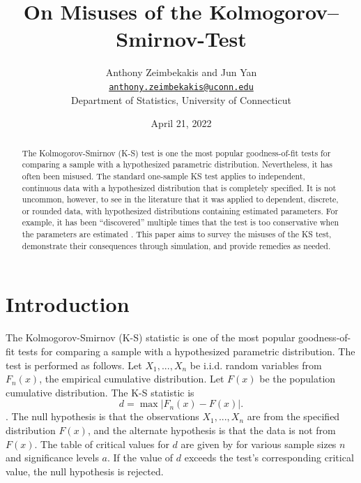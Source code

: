 \documentclass[12pt, letterpaper, titlepage]{article}
\title{On Misuses of the Kolmogorov–Smirnov-Test}
\author{Anthony Zeimbekakis and Jun Yan\\
\href{mailto:anthony.zeimbekakis@uconn.edu}{\nolinkurl{anthony.zeimbekakis@uconn.edu}}\\
Department of Statistics, University of Connecticut}
\date{April 21, 2022}
\begin{document}
\maketitle

\doublespace

\begin{abstract}
The Kolmogorov-Smirnov (K-S) test is one the most popular goodness-of-fit tests for 
comparing a sample with a hypothesized parametric distribution. Nevertheless, it has 
often been misused. The standard one-sample KS test applies to independent, continuous 
data with a hypothesized distribution that is completely specified. It is not uncommon, 
however, to see in the literature that it was applied to dependent, discrete, or 
rounded data, with hypothesized distributions containing estimated parameters. 
For example, it has been “discovered” multiple times that the test is too conservative 
when the parameters are estimated \citep[e.g.,][]{Steinskog}. This paper aims to survey 
the misuses of the KS test, demonstrate their consequences through simulation, and 
provide remedies as needed.
\end{abstract}


\hypertarget{sec:intro}{%
\section{Introduction}\label{sec:intro}}

The Kolmogorov-Smirnov (K-S) statistic is one of the most popular goodness-of-fit 
tests for comparing a sample with a hypothesized parametric distribution. The test is 
performed as follows. Let $X_1, ..., X_n$ be i.i.d. random variables from $F_{n}(x)$,
the empirical cumulative distribution.
Let $F(x)$ be the population cumulative distribution. The K-S 
statistic is 
\[
  d = \max{\lvert F_{n}(x) - F(x) \rvert}.
\].
The null hypothesis is that the observations $X_1, ..., X_n$ are from the specified distribution $F(x)$, and the 
alternate hypothesis is that the data is not from $F(x)$. The table of critical 
values for $d$ are given by \citet{Massey} for various sample sizes $n$ and significance 
levels $a$. If the value of $d$ exceeds the test's corresponding critical value, 
the null hypothesis is rejected.
\end{document}
